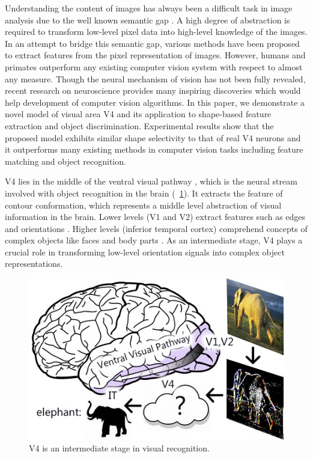 \documentclass[twocolumn]{article}
\begin{document}
Understanding the content of images has always been a difficult task in image analysis due to the well known semantic gap \cite{smeulders2000}.
A high degree of abstraction is required to transform low-level pixel data into high-level knowledge of the images.
In an attempt to bridge this semantic gap, various methods have been proposed to extract features from the pixel representation of images.
However, humans and primates outperform any existing computer vision system with respect to almost any measure.
Though the neural mechanism of vision has not been fully revealed,
recent research on neuroscience provides many inspiring discoveries which would help development of computer vision algorithms.
In this paper, we demonstrate a novel model of visual area V4 and its application to shape-based feature extraction and object discrimination.
Experimental results show that the proposed model exhibits similar shape selectivity to that of real V4 neurons
and it outperforms many existing methods in computer vision tasks including feature matching and object recognition. 

V4 lies in the middle of the ventral visual pathway \cite{ettlinger1990}, 
which is the neural stream involved with object recognition in the brain (\figurename~\ref{fig:1}).
It extracts the feature of contour conformation, which represents a middle level abstraction of visual information in the brain.
Lower levels (V1 and V2) extract features such as edges and orientations \cite{hubel1962}.
Higher levels (inferior temporal cortex) comprehend concepts of complex objects like faces and body parts \cite{bell2009}.
As an intermediate stage, V4 plays a crucial role in transforming low-level orientation signals into complex object representations.

\begin{figure}[!t]
\centerline{\includegraphics[width=0.8\linewidth]{images/fig1.jpg}} 
\caption{V4 is an intermediate stage in visual recognition.}
\label{fig:1}
\end{figure}
\end{document}
